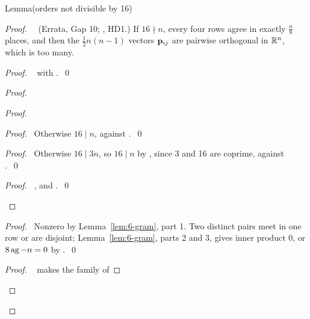 \begin{namedresult}{Lemma}{(orders not divisible by 16)}\label{lem:6-small}
\end{namedresult}
\begin{proof}
 \pfsketch\ \repair\ (Errata, Gap 10; , HD1.) If $16\nmid n$, every
 four rows agree in exactly $\frac n8$ places, and then the $\frac12n(n-1)$ vectors ${\mathbf p}_{ij}$
 are pairwise orthogonal in ${\mathbb R}^n$, which is too many.
 \begin{proof}\pf\  with .~\qed\end{proof}
 \begin{proof}
  \begin{proof}
   \begin{proof}\pf\ Otherwise $16\mid n$, against .~\qed\end{proof}
   \begin{proof}\pf\ Otherwise $16\mid3n$, so $16\mid n$ by
    , since 3 and 16 are coprime, against
    .~\qed\end{proof}
   \qedstep
   \begin{proof}\pf\ ,  and .~\qed\end{proof}
  \end{proof}
  \begin{proof}\pf\ Nonzero by Lemma~\ref{lem:6-gram}, part 1. Two distinct pairs meet in one row
   or are disjoint; Lemma~\ref{lem:6-gram}, parts 2 and 3, gives inner product 0, or
   $8\mathop{\mathrm{ag}}\nolimits-n=0$ by .~\qed\end{proof}
  \begin{proof}\pf\  makes the family of

\end{proof}
\end{proof}
\end{proof}
